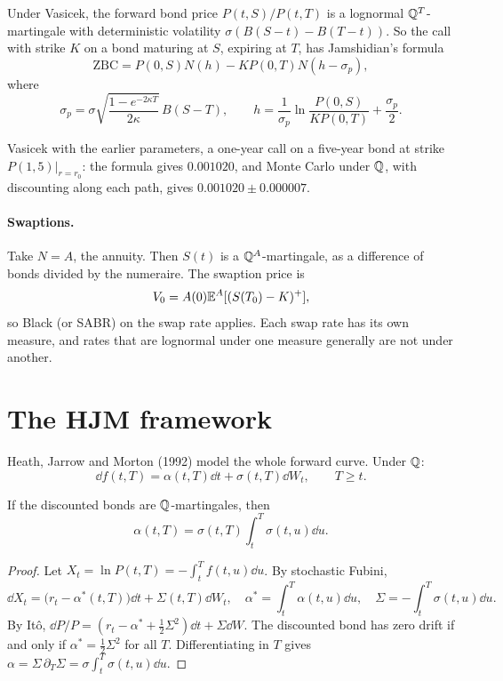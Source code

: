 \begin{example}
Under Vasicek, the forward bond price $P(t,S)/P(t,T)$ is a lognormal $\mathbb{Q}^T$-martingale with deterministic volatility $\sigma(B(S-t)-B(T-t))$. So the call with strike $K$ on a bond maturing at $S$, expiring at $T$, has Jamshidian's formula
\[
\mathrm{ZBC}=P(0,S)N(h)-KP(0,T)N(h-\sigma_p),
\]
where
\[
\sigma_p=\sigma\sqrt{\frac{1-e^{-2\kappa T}}{2\kappa}}\,B(S-T),\qquad h=\frac1{\sigma_p}\ln\frac{P(0,S)}{KP(0,T)}+\frac{\sigma_p}2.
\]
\end{example}

\begin{numcheck}
Vasicek with the earlier parameters, a one-year call on a five-year bond at strike $P(1,5)|_{r=r_0}$: the formula gives $0.001020$, and Monte Carlo under $\mathbb{Q}$, with discounting along each path, gives $0.001020\pm0.000007$.
\end{numcheck}

\paragraph{Swaptions.} Take $N=A$, the annuity. Then $S(t)$ is a $\mathbb{Q}^A$-martingale, as a difference of bonds divided by the numeraire. The swaption price is
\[
V_0=A(0)\mathbb{E}^A[(S(T_0)-K)^+],
\]
so Black (or SABR) on the swap rate applies. Each swap rate has its own measure, and rates that are lognormal under one measure generally are not under another.

\section{The HJM framework}

Heath, Jarrow and Morton (1992) model the whole forward curve. Under $\mathbb{Q}$:
\[
\dd f(t,T)=\alpha(t,T)\dd t+\sigma(t,T)\dd W_t,\qquad T\ge t.
\]

\begin{theorem}\label{thm:hjm}
If the discounted bonds are $\mathbb{Q}$-martingales, then
\[
\alpha(t,T)=\sigma(t,T)\int_t^T\sigma(t,u)\dd u.
\]
\end{theorem}
\begin{proof}
Let $X_t=\ln P(t,T)=-\int_t^Tf(t,u)\dd u$. By stochastic Fubini,
\[
\dd X_t=\bigl(r_t-\alpha^*(t,T)\bigr)\dd t+\Sigma(t,T)\dd W_t,\quad\alpha^*=\int_t^T\alpha(t,u)\dd u,\quad\Sigma=-\int_t^T\sigma(t,u)\dd u.
\]
By It\^o, $\dd P/P=(r_t-\alpha^*+\tfrac12\Sigma^2)\dd t+\Sigma\dd W$. The discounted bond has zero drift if and only if $\alpha^*=\tfrac12\Sigma^2$ for all $T$. Differentiating in $T$ gives $\alpha=\Sigma\,\partial_T\Sigma=\sigma\int_t^T\sigma(t,u)\dd u$.
\end{proof}

